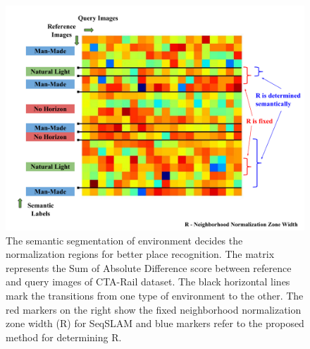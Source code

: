 \documentclass[letterpaper, 10 pt, conference]{ieeeconf}  %
\begin{document}
\begin{figure}
 \includegraphics[scale=0.25]{SADmat-NormalisationMethod}
 \caption{The semantic segmentation of environment decides the normalization regions for better place recognition. The matrix represents the Sum of Absolute Difference score between reference and query images of CTA-Rail dataset. The black horizontal lines mark the transitions from one type of environment to the other. The red markers on the right show the fixed neighborhood normalization zone width (R) for SeqSLAM and blue markers refer to the proposed method for determining R.}
 \label{fig:SADmatRdisplay}
\end{figure}
\end{document}
